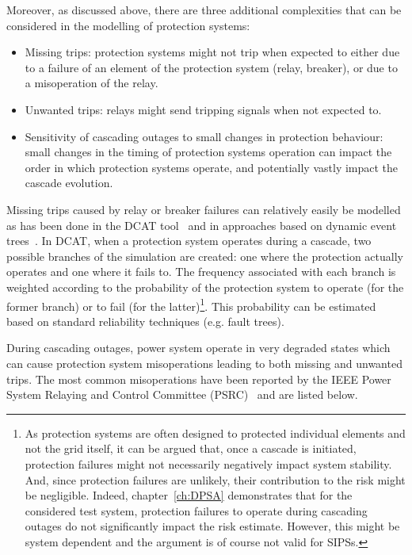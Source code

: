Moreover, as discussed above, there are three additional complexities that can be considered in the modelling of protection systems:

\begin{itemize}
    \item Missing trips: protection systems might not trip when expected to either due to a failure of an element of the protection system (relay, breaker), or due to a misoperation of the relay.
    \item Unwanted trips: relays might send tripping signals when not expected to.
    \item Sensitivity of cascading outages to small changes in protection behaviour: small changes in the timing of protection systems operation can impact the order in which protection systems operate, and potentially vastly impact the cascade evolution.
\end{itemize}

Missing trips caused by relay or breaker failures can relatively easily be modelled as has been done in the DCAT tool~\cite{DCATphase1} and in approaches based on dynamic event trees~\cite{TwoLevelPSA}. In DCAT, when a protection system operates during a cascade, two possible branches of the simulation are created: one where the protection actually operates and one where it fails to. The frequency associated with each branch is weighted according to the probability of the protection system to operate (for the former branch) or to fail (for the latter)\footnote{As protection systems are often designed to protected individual elements and not the grid itself, it can be argued that, once a cascade is initiated, protection failures might not necessarily negatively impact system stability. And, since protection failures are unlikely, their contribution to the risk might be negligible. Indeed, chapter~\ref{ch:DPSA} demonstrates that for the considered test system, protection failures to operate during cascading outages do not significantly impact the risk estimate. However, this might be system dependent and the argument is of course not valid for SIPSs.}. This probability can be estimated based on standard reliability techniques (e.g. fault trees).

During cascading outages, power system operate in very degraded states which can cause protection system misoperations leading to both missing and unwanted trips. The most common misoperations have been reported by the IEEE Power System Relaying and Control Committee (PSRC)~\cite{ProtectionFailuresDemetrios, PSRCreportProtectionMisop, PSRCreportSummaryProtectionMisop} and are listed below.

